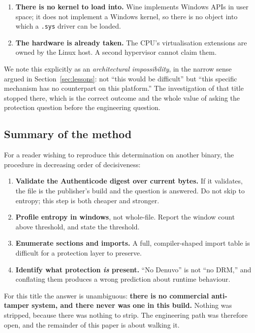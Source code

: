 \begin{enumerate}
\item \textbf{There is no kernel to load into.} Wine implements Windows APIs in
      user space; it does not implement a Windows kernel, so there is no object
      into which a \verb|.sys| driver can be loaded.
\item \textbf{The hardware is already taken.} The CPU's virtualisation extensions
      are owned by the Linux host. A second hypervisor cannot claim them.
\end{enumerate}

We note this explicitly as an \emph{architectural impossibility}, in the narrow
sense argued in Section~\ref{sec:lessons}: not ``this would be difficult'' but
``this specific mechanism has no counterpart on this platform.'' The
investigation of that title stopped there, which is the correct outcome and the
whole value of asking the protection question before the engineering question.

\subsection{Summary of the method}

For a reader wishing to reproduce this determination on another binary, the
procedure in decreasing order of decisiveness:

\begin{enumerate}
\item \textbf{Validate the Authenticode digest over current bytes.} If it
      validates, the file is the publisher's build and the question is answered.
      Do not skip to entropy; this step is both cheaper and stronger.
\item \textbf{Profile entropy in windows}, not whole-file. Report the window
      count above threshold, and state the threshold.
\item \textbf{Enumerate sections and imports.} A full, compiler-shaped import
      table is difficult for a protection layer to preserve.
\item \textbf{Identify what protection \emph{is} present.} ``No Denuvo'' is not
      ``no DRM,'' and conflating them produces a wrong prediction about runtime
      behaviour.
\end{enumerate}

For this title the answer is unambiguous: \textbf{there is no commercial
anti-tamper system, and there never was one in this build.} Nothing was
stripped, because there was nothing to strip. The engineering path was therefore
open, and the remainder of this paper is about walking it.

